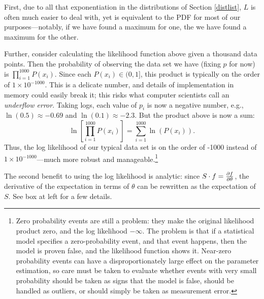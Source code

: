 First, due to all that exponentiation in the distributions
of Section \ref{distlist}, $L$ is often much easier to deal with, yet
is equivalent to the PDF for most of our purposes---notably, if we have
found a maximum for one, the we have found a maximum for the other.

Further, consider calculating the likelihood function above given
a thousand data points.  Then the probability of observing the data set
we have (fixing $p$ for now) is $\prod_{i=1}^{1000} P(x_i)$.  Since each
$P(x_i)\in (0,1]$, this product is typically on the order of $1\times
10^{-1000}$. This is a delicate number, and details of implementation in
memory could easily break it; this risks what computer scientists call an
{\sl underflow error}. Taking logs, each value of $p_i$ is now a negative
number, e.g., $\ln(0.5)\approx -0.69$ and $\ln(0.1)\approx -2.3$.  But the
product above is now a sum: $$\ln\left[\prod_{i=1}^{1000} P(x_i)\right]
= \sum_{i=1}^{1000} \ln\left(P(x_i)\right).$$ Thus, the log likelihood of our typical
data set is on the order of -1000 instead of $1\times 10^{-1000}$---much
more robust and manageable.\footnote{Zero probability events are still
a problem: they make the original likelihood product zero, and the log
likelihood $-\infty$. The problem is that if a statistical model
specifies a zero-probability event, and that event happens, then the
model is proven false, and the likelihood function shows it. Near-zero
probability events can have a disproportionately large effect on the
parameter estimation, so care must be taken to evaluate whether events with very
small probability should be taken as signs that the model is false,
should be handled as outliers, or should simply be taken as 
measurement error.}

The second benefit to using the log likelihood is analytic: since $S \cdot
f = {\partial f \over \partial \theta}$, the derivative of the expectation
in terms of $\theta$ can be rewritten as the expectation of $S$. See box
at left for a few details.

